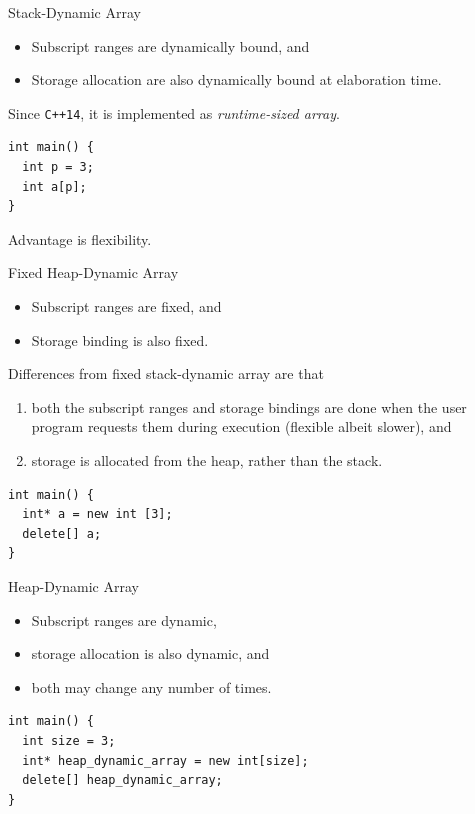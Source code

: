 \documentclass[presentation]{beamer}
\begin{document}
\begin{frame}[fragile,label={sec:orgheadline25}]{Stack-Dynamic Array}
 \begin{itemize}
\item Subscript ranges are dynamically bound, and
\item Storage allocation are also dynamically bound at elaboration
time.
\end{itemize}


Since \texttt{C++14}, it is implemented as \emph{runtime-sized array}.

\begin{verbatim}
int main() {
  int p = 3;
  int a[p];
}
\end{verbatim}

Advantage is flexibility.
\end{frame}

\begin{frame}[fragile,label={sec:orgheadline26}]{Fixed Heap-Dynamic Array}
 \begin{itemize}
\item Subscript ranges are fixed, and
\item Storage binding is also fixed.
\end{itemize}


Differences from fixed stack-dynamic array are that
\begin{enumerate}
\item both the subscript ranges and storage bindings are done when the
user program requests them during execution (flexible albeit
slower), and
\item storage is allocated from the heap, rather than the stack.
\end{enumerate}


\begin{verbatim}
int main() {
  int* a = new int [3];
  delete[] a;
}
\end{verbatim}
\end{frame}

\begin{frame}[fragile,label={sec:orgheadline27}]{Heap-Dynamic Array}
 \begin{itemize}
\item Subscript ranges are dynamic,
\item storage allocation is also dynamic, and
\item both may change any number of times.
\end{itemize}


\begin{verbatim}
int main() {
  int size = 3;
  int* heap_dynamic_array = new int[size];
  delete[] heap_dynamic_array;
}
\end{verbatim}
\end{frame}
\end{document}
